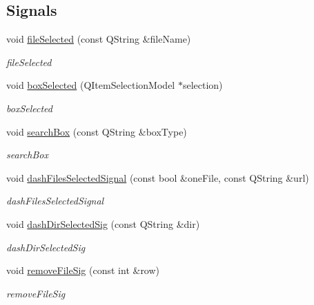 \subsection*{Signals}
\begin{DoxyCompactItemize}
\item 
void \hyperlink{class_main_window_a49edf26b374679e5569a25de2f05ab87}{file\-Selected} (const Q\-String \&file\-Name)
\begin{DoxyCompactList}\small\item\em file\-Selected \end{DoxyCompactList}\item 
void \hyperlink{class_main_window_adc10d5521d5f7c43a57fceb4e2a5953e}{box\-Selected} (Q\-Item\-Selection\-Model $\ast$selection)
\begin{DoxyCompactList}\small\item\em box\-Selected \end{DoxyCompactList}\item 
void \hyperlink{class_main_window_add6f50ee0cfda97372eea9fbfea8f09b}{search\-Box} (const Q\-String \&box\-Type)
\begin{DoxyCompactList}\small\item\em search\-Box \end{DoxyCompactList}\item 
void \hyperlink{class_main_window_a3cacf65545a464647562b468a0e08f36}{dash\-Files\-Selected\-Signal} (const bool \&one\-File, const Q\-String \&url)
\begin{DoxyCompactList}\small\item\em dash\-Files\-Selected\-Signal \end{DoxyCompactList}\item 
void \hyperlink{class_main_window_ab20d195ebd6ecf001235d88f1c7c680b}{dash\-Dir\-Selected\-Sig} (const Q\-String \&dir)
\begin{DoxyCompactList}\small\item\em dash\-Dir\-Selected\-Sig \end{DoxyCompactList}\item 
void \hyperlink{class_main_window_a9afe6d97db65fe1cdff622187fbb86bc}{remove\-File\-Sig} (const int \&row)
\begin{DoxyCompactList}\small\item\em remove\-File\-Sig \end{DoxyCompactList}\end{DoxyCompactItemize}
